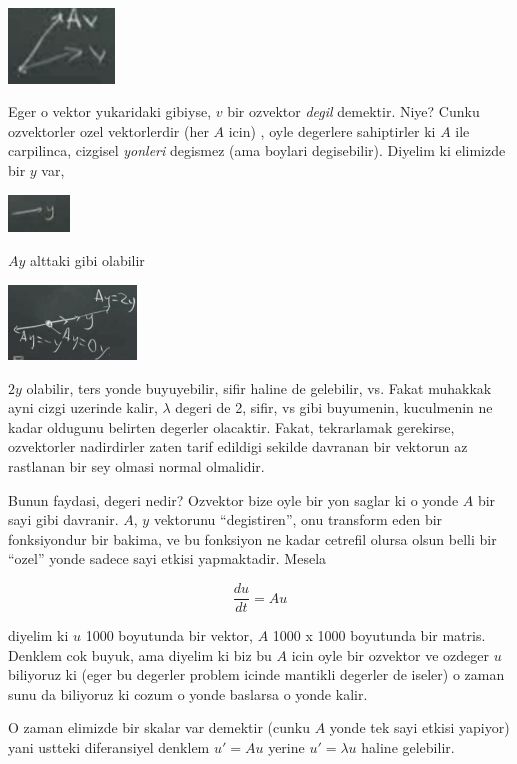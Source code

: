 \documentclass[12pt,fleqn]{article}\usepackage{../common}
\begin{document}
\includegraphics[height=2cm]{5_2.png}

Eger o vektor yukaridaki gibiyse, $v$ bir ozvektor {\em degil}
demektir. Niye? Cunku ozvektorler ozel vektorlerdir (her $A$ icin) , oyle
degerlere sahiptirler ki $A$ ile carpilinca, cizgisel {\em yonleri}
degismez (ama boylari degisebilir). Diyelim ki elimizde bir $y$ var,

\includegraphics[height=1cm]{5_3.png}

$Ay$ alttaki gibi olabilir

\includegraphics[height=2cm]{5_4.png}

$2y$ olabilir, ters yonde buyuyebilir, sifir haline de gelebilir, vs. Fakat
muhakkak ayni cizgi uzerinde kalir, $\lambda$ degeri de 2, sifir, vs gibi
buyumenin, kuculmenin ne kadar oldugunu belirten degerler olacaktir. Fakat,
tekrarlamak gerekirse, ozvektorler nadirdirler zaten tarif edildigi sekilde
davranan bir vektorun az rastlanan bir sey olmasi normal olmalidir.

Bunun faydasi, degeri nedir? Ozvektor bize oyle bir yon saglar ki o yonde
$A$ bir sayi gibi davranir. $A$, $y$ vektorunu ``degistiren'', onu
transform eden bir fonksiyondur bir bakima, ve bu fonksiyon ne kadar
cetrefil olursa olsun belli bir ``ozel'' yonde sadece sayi etkisi
yapmaktadir. Mesela

\[ \frac{du}{dt} = Au \]

diyelim ki $u$ 1000 boyutunda bir vektor, $A$ 1000 x 1000 boyutunda bir
matris. Denklem cok buyuk, ama diyelim ki biz bu $A$ icin oyle bir ozvektor
ve ozdeger $u$ biliyoruz ki (eger bu degerler problem icinde mantikli
degerler de iseler) o zaman sunu da biliyoruz ki cozum o yonde baslarsa o
yonde kalir.

O zaman elimizde bir skalar var demektir (cunku $A$ yonde tek sayi etkisi
yapiyor) yani ustteki diferansiyel denklem $u' = Au$ yerine $u' = \lambda
u$ haline 
gelebilir.
\end{document}

